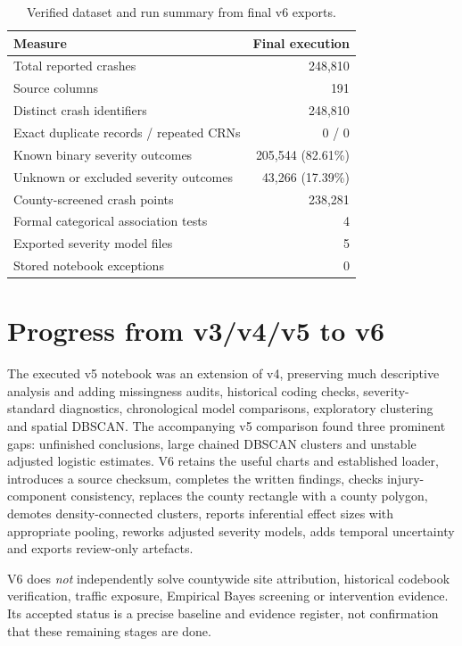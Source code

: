 \documentclass[11pt,a4paper,openany]{report}
\begin{document}
\begin{table}[htbp]\centering\small
\caption{Verified dataset and run summary from final v6 exports.}
\begin{tabular}{@{}lr@{}}\toprule Measure & Final execution\\\midrule
Total reported crashes & 248,810\\
Source columns & 191\\
Distinct crash identifiers & 248,810\\
Exact duplicate records / repeated CRNs & 0 / 0\\
Known binary severity outcomes & 205,544 (82.61\%)\\
Unknown or excluded severity outcomes & 43,266 (17.39\%)\\
County-screened crash points & 238,281\\
Formal categorical association tests & 4\\
Exported severity model files & 5\\
Stored notebook exceptions & 0\\
\bottomrule\end{tabular}
\end{table}

\section{Progress from v3/v4/v5 to v6}
The executed v5 notebook was an extension of v4, preserving much descriptive analysis and adding missingness audits, historical coding checks, severity-standard diagnostics, chronological model comparisons, exploratory clustering and spatial DBSCAN. The accompanying v5 comparison found three prominent gaps: unfinished conclusions, large chained DBSCAN clusters and unstable adjusted logistic estimates. V6 retains the useful charts and established loader, introduces a source checksum, completes the written findings, checks injury-component consistency, replaces the county rectangle with a county polygon, demotes density-connected clusters, reports inferential effect sizes with appropriate pooling, reworks adjusted severity models, adds temporal uncertainty and exports review-only artefacts.

V6 does \emph{not} independently solve countywide site attribution, historical codebook verification, traffic exposure, Empirical Bayes screening or intervention evidence. Its accepted status is a precise baseline and evidence register, not confirmation that these remaining stages are done.
\end{document}
